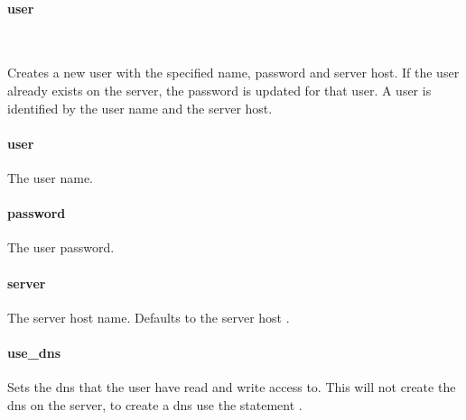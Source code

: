 \paragraph{user}

\\

Creates a new user with the specified name, password and server host.
If the user already exists on the server, the password is updated for that user.
A user is identified by the user name and the server host.

\paragraph{user}


The user name.

\paragraph{password}


The user password.

\paragraph{server}


The server host name. Defaults to the server host .

\paragraph{use\_dns}


Sets the dns that the user have read and write access to. This will not create
the dns on the server, to create a dns use the statement .

